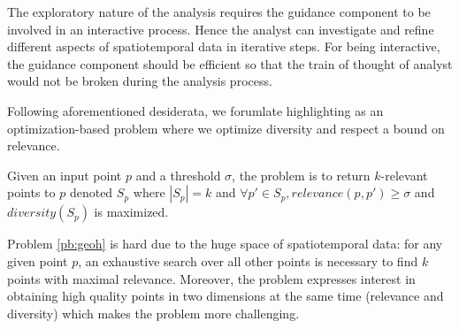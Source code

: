  The exploratory nature of the analysis requires the guidance component to be involved in an interactive process. Hence the analyst can investigate and refine different aspects of spatiotemporal data in iterative steps. For being interactive, the guidance component should be efficient so that the train of thought of analyst would not be broken during the analysis process.

\vspace{5pt}
Following aforementioned desiderata, we forumlate highlighting as an optimization-based problem where we optimize diversity and respect a bound on relevance.

\begin{problem}[\pb]
\label{pb:geoh}
Given an input point $p$ and a threshold $\sigma$, the problem is to return $k$-relevant points to $p$ denoted $S_p$ where $|S_p| = k$ and $\forall p' \in S_p, \mathit{relevance}(p,p') \geq \sigma$ and $\mathit{diversity}(S_p)$ is maximized.
\end{problem}

Problem \ref{pb:geoh} is hard due to the huge space of spatiotemporal data: for any given point $p$, an exhaustive search over all other points is necessary to find $k$ points with maximal relevance. Moreover, the problem expresses interest in obtaining high quality points in two dimensions at the same time (relevance and diversity) which makes the problem more challenging.

